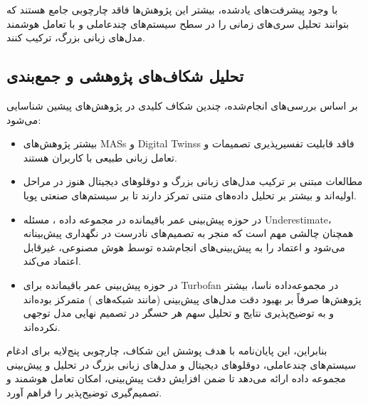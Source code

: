 با وجود پیشرفت‌های یادشده، بیشتر این پژوهش‌ها فاقد چارچوبی جامع هستند که بتوانند تحلیل سری‌های زمانی را در سطح سیستم‌های چندعاملی و با تعامل هوشمند مدل‌های زبانی بزرگ، ترکیب کنند.




\subsection{تحلیل شکاف‌های پژوهشی و جمع‌بندی}
بر اساس بررسی‌های انجام‌شده، چندین شکاف کلیدی در پژوهش‌های پیشین شناسایی می‌شود:
\begin{itemize}
	\item
	 بیشتر پژوهش‌های 
	\glspl{MAS} و
	\glspl{Digital Twins}
	 فاقد قابلیت تفسیرپذیری تصمیمات و تعامل زبانی طبیعی با کاربران هستند.
	 
	\item
	 مطالعات مبتنی بر 
	ترکیب مدل‌های زبانی بزرگ و دوقلوهای دیجیتال
	 هنوز در مراحل اولیه‌اند و بیشتر بر تحلیل داده‌های متنی تمرکز دارند تا بر سیستم‌های صنعتی پویا.
	 
	\item
	 در حوزه پیش‌بینی عمر باقیمانده در مجموعه داده ، مسئله 
	 \gls{Underestimate}،
	  همچنان چالشی مهم است که منجر به تصمیم‌های نادرست در نگهداری پیش‌بینانه می‌شود و اعتماد را به پیش‌بینی‌های انجام‌شده توسط هوش مصنوعی، غیرقابل اعتماد می‌کند.
	
	\item
	در حوزه پیش‌بینی عمر باقیمانده برای \gls{Turbofan} در مجموعه‌داده 
		ناسا، بیشتر پژوهش‌ها صرفاً بر بهبود دقت مدل‌های پیش‌بینی (مانند شبکه‌های ) متمرکز بوده‌اند و به توضیح‌پذیری نتایج و تحلیل سهم هر حسگر در تصمیم نهایی مدل توجهی نکرده‌اند.
	
	
\end{itemize}

بنابراین، این پایان‌نامه با هدف پوشش این شکاف، چارچوبی پنج‌لایه برای ادغام سیستم‌های چندعاملی، دوقلوهای دیجیتال و مدل‌های زبانی بزرگ در تحلیل و پیش‌بینی مجموعه داده  ارائه می‌دهد تا ضمن افزایش دقت پیش‌بینی، امکان تعامل هوشمند و تصمیم‌گیری توضیح‌پذیر را فراهم آورد.



